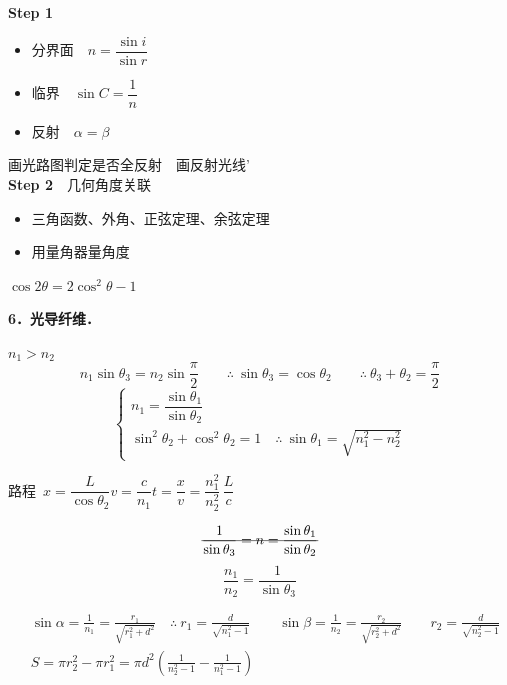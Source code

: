 \textbf{Step 1}
\begin{itemize}
\item 分界面　$n=\dfrac{\sin i}{\sin r}$
\item 临界　$\sin C=\dfrac{1}{n}$
\item 反射　$\alpha=\beta$
\end{itemize}
画光路图判定是否全反射　画反射光线'\\[0.8ex]
\textbf{Step 2}　几何角度关联
\begin{itemize}
\item 三角函数、外角、正弦定理、余弦定理　
\item 用量角器量角度
\end{itemize}
$\cos2\theta=2\cos^2\theta-1$

\textbf{6．光导纤维．}


$n_1>n_2$
\[n_1\sin\theta_3=n_2\sin\frac{\pi}{2}\qquad\therefore\ \sin\theta_3=\cos\theta_2\qquad\therefore\ \theta_3+\theta_2=\frac{\pi}{2}\]
\[\left\{\begin{array}{l}n_1=\dfrac{\sin\theta_1}{\sin\theta_2}\\[2mm]\sin^2\theta_2+\cos^2\theta_2=1\quad\therefore\ \sin\theta_1=\sqrt{n_1^2-n_2^2}\end{array}\right.\]

路程\ $x=\dfrac{L}{\cos\theta_2}$\qquad $v=\dfrac{c}{n_1}$\qquad $t=\dfrac{x}{v}=\dfrac{n_1^2}{n_2^2}\,\dfrac{L}{c}$ %

\[\text{\struck{$\dfrac{1}{\sin\theta_3}=n=\dfrac{\sin\theta_1}{\sin\theta_2}$}}\]
\[\frac{n_1}{n_2}=\frac{1}{\sin\theta_3}\]

\begin{problem}[5]
\begin{solution}
\begin{align*}
&\sin\alpha=\frac{1}{n_1}=\frac{r_1}{\sqrt{r_1^2+d^2}}\quad\therefore\ r_1=\frac{d}{\sqrt{n_1^2-1}}\qquad
\sin\beta=\frac{1}{n_2}=\frac{r_2}{\sqrt{r_2^2+d^2}}\qquad r_2=\frac{d}{\sqrt{n_2^2-1}}\\
&S=\pi r_2^2-\pi r_1^2=\pi d^2\left(\frac{1}{n_2^2-1}-\frac{1}{n_1^2-1}\right)
\end{align*}
\end{solution}
\end{problem}


